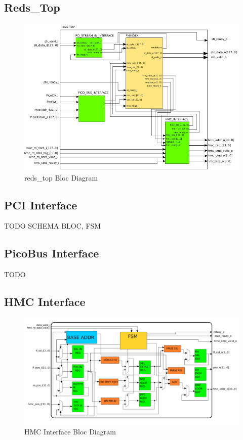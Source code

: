 \subsection{Reds\_Top}
\begin{figure}[H]
    \centering
    \includegraphics[scale = 0.55]{Figures/REDS_TOP_DIAG.png}
    \caption{reds\_top Bloc Diagram}
    \label{fig:reds_top_diag}
\end{figure}

\subsection{PCI Interface}
TODO
SCHEMA BLOC, FSM

\subsection{PicoBus Interface}
TODO
\subsection{HMC Interface}

\begin{figure}[H]
    \centering
    \hspace*{-20mm}\includegraphics[scale = 0.3 ]{Figures/HMC_DIAG.png}
    \caption{HMC Interface Bloc Diagram}
    \label{fig:HMC_DIAG}
\end{figure}

